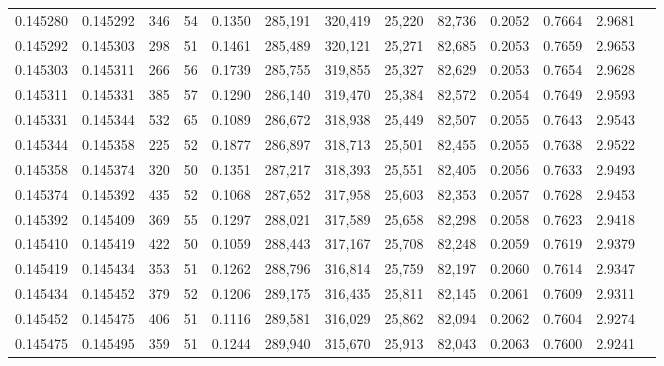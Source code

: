 \begin{tabular}{rrrrrrrrrrrrr}
0.145280 & 0.145292 &   346 &  54 &                                     0.1350 & 285,191 & 320,419 &  25,220 &  82,736 & 0.2052 & 0.7664 & 2.9681 \\
0.145292 & 0.145303 &   298 &  51 &                                     0.1461 & 285,489 & 320,121 &  25,271 &  82,685 & 0.2053 & 0.7659 & 2.9653 \\
0.145303 & 0.145311 &   266 &  56 &                                     0.1739 & 285,755 & 319,855 &  25,327 &  82,629 & 0.2053 & 0.7654 & 2.9628 \\
0.145311 & 0.145331 &   385 &  57 &                                     0.1290 & 286,140 & 319,470 &  25,384 &  82,572 & 0.2054 & 0.7649 & 2.9593 \\
0.145331 & 0.145344 &   532 &  65 &                                     0.1089 & 286,672 & 318,938 &  25,449 &  82,507 & 0.2055 & 0.7643 & 2.9543 \\
0.145344 & 0.145358 &   225 &  52 &                                     0.1877 & 286,897 & 318,713 &  25,501 &  82,455 & 0.2055 & 0.7638 & 2.9522 \\
0.145358 & 0.145374 &   320 &  50 &                                     0.1351 & 287,217 & 318,393 &  25,551 &  82,405 & 0.2056 & 0.7633 & 2.9493 \\
0.145374 & 0.145392 &   435 &  52 &                                     0.1068 & 287,652 & 317,958 &  25,603 &  82,353 & 0.2057 & 0.7628 & 2.9453 \\
0.145392 & 0.145409 &   369 &  55 &                                     0.1297 & 288,021 & 317,589 &  25,658 &  82,298 & 0.2058 & 0.7623 & 2.9418 \\
0.145410 & 0.145419 &   422 &  50 &                                     0.1059 & 288,443 & 317,167 &  25,708 &  82,248 & 0.2059 & 0.7619 & 2.9379 \\
0.145419 & 0.145434 &   353 &  51 &                                     0.1262 & 288,796 & 316,814 &  25,759 &  82,197 & 0.2060 & 0.7614 & 2.9347 \\
0.145434 & 0.145452 &   379 &  52 &                                     0.1206 & 289,175 & 316,435 &  25,811 &  82,145 & 0.2061 & 0.7609 & 2.9311 \\
0.145452 & 0.145475 &   406 &  51 &                                     0.1116 & 289,581 & 316,029 &  25,862 &  82,094 & 0.2062 & 0.7604 & 2.9274 \\
0.145475 & 0.145495 &   359 &  51 &                                     0.1244 & 289,940 & 315,670 &  25,913 &  82,043 & 0.2063 & 0.7600 & 2.9241 \\

\end{tabular}
